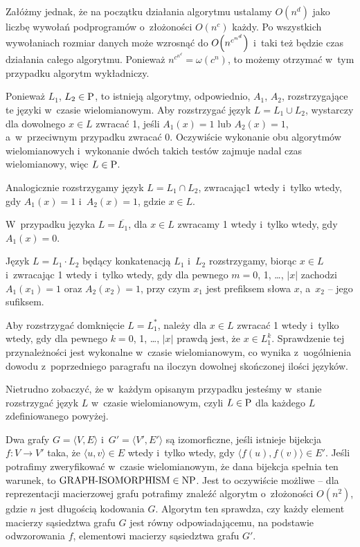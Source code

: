 Załóżmy jednak, że na początku działania algorytmu ustalamy $O(n^d)$ jako liczbę wywołań podprogramów o~złożoności $O(n^c)$ każdy.
Po wszystkich wywołaniach rozmiar danych może wzrosnąć do $O\Bigl(n^{c^{n^d}}\Bigr)$ i~taki też będzie czas działania całego algorytmu.
Ponieważ $n^{c^{n^d}}\!\!=\omega(c^n)$, to możemy otrzymać w~tym przypadku algorytm wykładniczy.

\exercise %
Ponieważ $L_1$, $L_2\in\text{P}$, to istnieją algorytmy, odpowiednio, $A_1$, $A_2$, rozstrzygające te języki w~czasie wielomianowym.
Aby rozstrzygać język $L=L_1\cup L_2$, wystarczy dla dowolnego $x\in L$ zwracać 1, jeśli $A_1(x)=1$ lub $A_2(x)=1$, a~w~przeciwnym przypadku zwracać 0.
Oczywiście wykonanie obu algorytmów wielomianowych i~wykonanie dwóch takich testów zajmuje nadal czas wielomianowy, więc $L\in\text{P}$.

Analogicznie rozstrzygamy język $L=L_1\cap L_2$, zwracając1 wtedy i~tylko wtedy, gdy $A_1(x)=1$ i~$A_2(x)=1$, gdzie $x\in L$.

W~przypadku języka $L=\overline{L_1}$, dla $x\in L$ zwracamy 1 wtedy i~tylko wtedy, gdy $A_1(x)=0$.

Język $L=L_1\cdot L_2$ będący konkatenacją $L_1$ i~$L_2$ rozstrzygamy, biorąc $x\in L$ i~zwracając 1 wtedy i~tylko wtedy, gdy dla pewnego $m=0$, 1, \dots, $|x|$ zachodzi $A_1(x_1)=1$ oraz $A_2(x_2)=1$, przy czym $x_1$ jest  prefiksem słowa $x$, a~$x_2$ -- jego  sufiksem.

Aby rozstrzygać domknięcie $L=L_1^*$, należy dla $x\in L$ zwracać 1 wtedy i~tylko wtedy, gdy dla pewnego $k=0$, 1, \dots, $|x|$ prawdą jest, że $x\in L_1^k$.
Sprawdzenie tej przynależności jest wykonalne w~czasie wielomianowym, co wynika z~uogólnienia dowodu z~poprzedniego paragrafu na iloczyn dowolnej skończonej ilości języków.

Nietrudno zobaczyć, że w~każdym opisanym przypadku jesteśmy w~stanie rozstrzygać język $L$ w~czasie wielomianowym, czyli $L\in\text{P}$ dla każdego $L$ zdefiniowanego powyżej.


\exercise %
Dwa grafy $G=\langle V,E\rangle$ i~$G'=\langle V',E'\rangle$ są izomorficzne, jeśli istnieje bijekcja $f\colon V\to V'$ taka, że $\langle u,v\rangle\in E$ wtedy i~tylko wtedy, gdy $\langle f(u),f(v)\rangle\in E'$.
Jeśli potrafimy zweryfikować w~czasie wielomianowym, że dana bijekcja spełnia ten warunek, to $\text{GRAPH-ISOMORPHISM}\in\text{NP}$.
Jest to oczywiście możliwe -- dla reprezentacji macierzowej grafu potrafimy znaleźć algorytm o~złożoności $O(n^2)$, gdzie $n$ jest długością kodowania $G$.
Algorytm ten sprawdza, czy każdy element macierzy sąsiedztwa grafu $G$ jest równy odpowiadającemu, na podstawie odwzorowania $f$, elementowi macierzy sąsiedztwa grafu $G'$.

